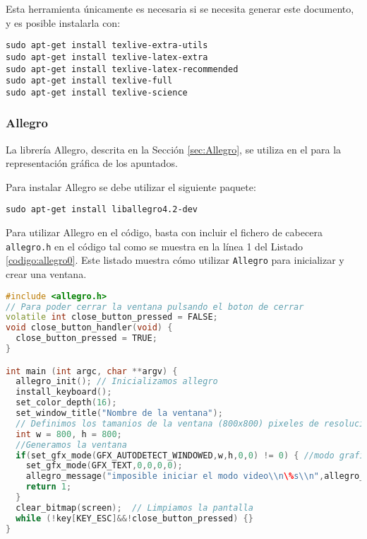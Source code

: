 Esta herramienta únicamente es necesaria si se necesita generar este documento, y
es posible instalarla con:
\begin{lstlisting}[numbers=none]
sudo apt-get install texlive-extra-utils
sudo apt-get install texlive-latex-extra
sudo apt-get install texlive-latex-recommended
sudo apt-get install texlive-full
sudo apt-get install texlive-science
\end{lstlisting}

\subsubsection{Allegro}
La librería Allegro, descrita en la Sección \ref{sec:Allegro}, se utiliza en el
\CSUO{} para la representación gráfica de los apuntados.

Para instalar Allegro se debe utilizar el siguiente paquete:
\begin{lstlisting}[numbers=none]
sudo apt-get install liballegro4.2-dev
\end{lstlisting}

Para utilizar Allegro en el código, basta con incluir el fichero de cabecera
\texttt{allegro.h} en el código tal como se muestra en la línea 1 del Listado \ref{codigo:allegro0}.
Este listado muestra cómo utilizar \texttt{Allegro} para inicializar y crear
una ventana.
\begin{lstlisting}[language=C++,basicstyle=\ttfamily\footnotesize,
                   caption={Ejemplo básico de uso de la librería Allegro},
                   label={codigo:allegro0}]
#include <allegro.h>
// Para poder cerrar la ventana pulsando el boton de cerrar
volatile int close_button_pressed = FALSE;
void close_button_handler(void) {
  close_button_pressed = TRUE;
}

int main (int argc, char **argv) {
  allegro_init(); // Inicializamos allegro
  install_keyboard();
  set_color_depth(16);
  set_window_title("Nombre de la ventana");
  // Definimos los tamanios de la ventana (800x800) pixeles de resolucion
  int w = 800, h = 800;
  //Generamos la ventana
  if(set_gfx_mode(GFX_AUTODETECT_WINDOWED,w,h,0,0) != 0) { //modo grafico
    set_gfx_mode(GFX_TEXT,0,0,0,0);
    allegro_message("imposible iniciar el modo video\\n\%s\\n",allegro_error);
    return 1;
  }
  clear_bitmap(screen);  // Limpiamos la pantalla
  while (!key[KEY_ESC]&&!close_button_pressed) {}
}
\end{lstlisting}

